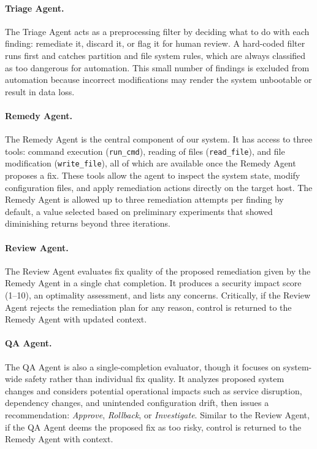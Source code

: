 \documentclass[pdflatex,sn-mathphys-num]{sn-jnl}%
\begin{document}
\paragraph{Triage Agent.} The Triage Agent acts as a preprocessing filter by deciding what to do with each finding: remediate it, discard it, or flag it for human review. A hard-coded filter runs first and catches partition and file system rules, which are always classified as too dangerous for automation. This small number of findings is excluded from automation because incorrect modifications may render the system unbootable or result in data loss.

\paragraph{Remedy Agent.} The Remedy Agent is the central component of our system. It has access to three tools: command execution (\texttt{run\_cmd}), reading of files (\texttt{read\_file}), and file modification (\texttt{write\_file}), all of which are available once the Remedy Agent proposes a fix. These tools allow the agent to inspect the system state, modify configuration files, and apply remediation actions directly on the target host. The Remedy Agent is allowed up to three remediation attempts per finding by default, a value selected based on preliminary experiments that showed diminishing returns beyond three iterations.

\paragraph{Review Agent.} The Review Agent evaluates fix quality of the proposed remediation given by the Remedy Agent in a single chat completion. It produces a security impact score (1--10), an optimality assessment, and lists any concerns. Critically, if the Review Agent rejects the remediation plan for any reason, control is returned to the Remedy Agent with updated context.

\paragraph{QA Agent.} The QA Agent is also a single-completion evaluator, though it focuses on system-wide safety rather than individual fix quality. It analyzes proposed system changes and considers potential operational impacts such as service disruption, dependency changes, and unintended configuration drift, then issues a recommendation: \emph{Approve}, \emph{Rollback}, or \emph{Investigate}. Similar to the Review Agent, if the QA Agent deems the proposed fix as too risky, control is returned to the Remedy Agent with context.
\end{document}
